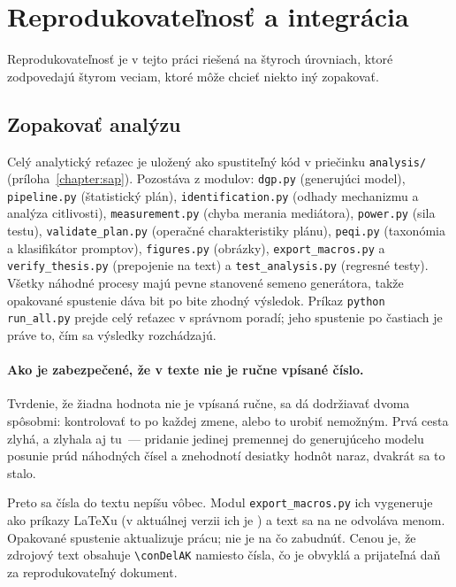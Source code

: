 \section{Reprodukovateľnosť a integrácia}
\label{sec:reprodukovatelnost}

Reprodukovateľnosť je v tejto práci riešená na štyroch úrovniach, ktoré zodpovedajú štyrom veciam, ktoré môže chcieť niekto iný zopakovať.

\subsection{Zopakovať analýzu}

Celý analytický reťazec je uložený ako spustiteľný kód v priečinku \texttt{analysis/} (príloha~\ref{chapter:sap}). Pozostáva z \repoModules{} modulov: \texttt{dgp.py} (generujúci model), \texttt{pipeline.py} (štatistický plán), \texttt{identification.py} (odhady mechanizmu a analýza citlivosti), \texttt{measurement.py} (chyba merania mediátora), \texttt{power.py} (sila testu), \texttt{validate\_plan.py} (operačné charakteristiky plánu), \texttt{peqi.py} (taxonómia a klasifikátor promptov), \texttt{figures.py} (obrázky), \texttt{export\_macros.py} a \texttt{verify\_thesis.py} (prepojenie na text) a \texttt{test\_analysis.py} (regresné testy). Všetky náhodné procesy majú pevne stanovené semeno generátora, takže opakované spustenie dáva bit po bite zhodný výsledok. Príkaz \texttt{python run\_all.py} prejde celý reťazec v správnom poradí; jeho spustenie po častiach je práve to, čím sa výsledky rozchádzajú.

\paragraph{Ako je zabezpečené, že v texte nie je ručne vpísané číslo.} Tvrdenie, že žiadna hodnota nie je vpísaná ručne, sa dá dodržiavať dvoma spôsobmi: kontrolovať to po každej zmene, alebo to urobiť nemožným. Prvá cesta zlyhá, a zlyhala aj tu~--- pridanie jedinej premennej do generujúceho modelu posunie prúd náhodných čísel a znehodnotí desiatky hodnôt naraz, dvakrát sa to stalo.

Preto sa čísla do textu nepíšu vôbec. Modul \texttt{export\_macros.py} ich vygeneruje ako príkazy \LaTeX{}u (v aktuálnej verzii ich je \repoMacros) a text sa na ne odvoláva menom. Opakované spustenie aktualizuje prácu; nie je na čo zabudnúť. Cenou je, že zdrojový text obsahuje \verb|\conDelAK| namiesto čísla, čo je obvyklá a prijateľná daň za reprodukovateľný dokument.


